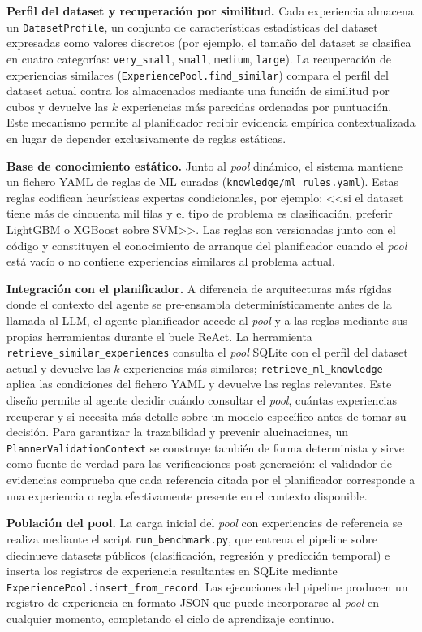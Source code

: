 \textbf{Perfil del dataset y recuperación por similitud.} Cada experiencia almacena un \texttt{DatasetProfile}, un conjunto de características estadísticas del dataset expresadas como valores discretos (por ejemplo, el tamaño del dataset se clasifica en cuatro categorías: \texttt{very\_small}, \texttt{small}, \texttt{medium}, \texttt{large}). La recuperación de experiencias similares (\texttt{ExperiencePool.find\_similar}) compara el perfil del dataset actual contra los almacenados mediante una función de similitud por cubos y devuelve las $k$ experiencias más parecidas ordenadas por puntuación. Este mecanismo permite al planificador recibir evidencia empírica contextualizada en lugar de depender exclusivamente de reglas estáticas.

\textbf{Base de conocimiento estático.} Junto al \emph{pool} dinámico, el sistema mantiene un fichero YAML de reglas de ML curadas (\texttt{knowledge/ml\_rules.yaml}). Estas reglas codifican heurísticas expertas condicionales, por ejemplo: <<si el dataset tiene más de cincuenta mil filas y el tipo de problema es clasificación, preferir LightGBM o XGBoost sobre SVM>>. Las reglas son versionadas junto con el código y constituyen el conocimiento de arranque del planificador cuando el \emph{pool} está vacío o no contiene experiencias similares al problema actual.

\textbf{Integración con el planificador.} A diferencia de arquitecturas más rígidas donde el contexto del agente se pre-ensambla determinísticamente antes de la llamada al LLM, el agente planificador accede al \emph{pool} y a las reglas mediante sus propias herramientas durante el bucle ReAct. La herramienta \texttt{retrieve\_similar\_experiences} consulta el \emph{pool} SQLite con el perfil del dataset actual y devuelve las $k$ experiencias más similares; \texttt{retrieve\_ml\_knowledge} aplica las condiciones del fichero YAML y devuelve las reglas relevantes. Este diseño permite al agente decidir cuándo consultar el \emph{pool}, cuántas experiencias recuperar y si necesita más detalle sobre un modelo específico antes de tomar su decisión. Para garantizar la trazabilidad y prevenir alucinaciones, un \texttt{PlannerValidationContext} se construye también de forma determinista y sirve como fuente de verdad para las verificaciones post-generación: el validador de evidencias comprueba que cada referencia citada por el planificador corresponde a una experiencia o regla efectivamente presente en el contexto disponible.

\textbf{Población del pool.} La carga inicial del \emph{pool} con experiencias de referencia se realiza mediante el script \texttt{run\_benchmark.py}, que entrena el pipeline sobre diecinueve datasets públicos (clasificación, regresión y predicción temporal) e inserta los registros de experiencia resultantes en SQLite mediante \texttt{ExperiencePool.insert\_from\_record}. Las ejecuciones del pipeline producen un registro de experiencia en formato JSON que puede incorporarse al \emph{pool} en cualquier momento, completando el ciclo de aprendizaje continuo.


